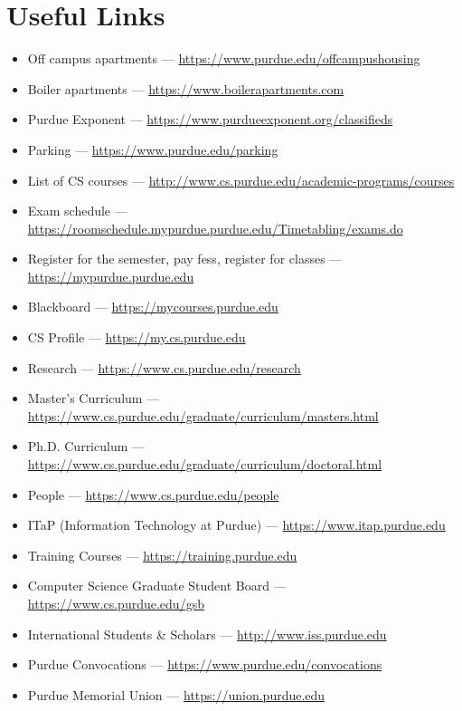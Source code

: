 \section{Useful Links}

\begin{itemize}

	\item Off campus apartments --- \url{https://www.purdue.edu/offcampushousing}

	\item Boiler apartments --- \url{https://www.boilerapartments.com}

	\item Purdue Exponent --- \url{https://www.purdueexponent.org/classifieds}

	\item Parking --- \url{https://www.purdue.edu/parking}

	\item List of CS courses --- \url{http://www.cs.purdue.edu/academic-programs/courses}

	\item Exam schedule --- \url{https://roomschedule.mypurdue.purdue.edu/Timetabling/exams.do}

	\item Register for the semester, pay fess, register for classes --- \url{https://mypurdue.purdue.edu}

	\item Blackboard --- \url{https://mycourses.purdue.edu}

	\item CS Profile --- \url{https://my.cs.purdue.edu}

	\item Research --- \url{https://www.cs.purdue.edu/research}

	\item Master's Curriculum --- \url{https://www.cs.purdue.edu/graduate/curriculum/masters.html}

	\item Ph.D. Curriculum --- \url{https://www.cs.purdue.edu/graduate/curriculum/doctoral.html}

	\item People --- \url{https://www.cs.purdue.edu/people}

	\item ITaP (Information Technology at Purdue) --- \url{https://www.itap.purdue.edu}

	\item Training Courses --- \url{https://training.purdue.edu}

	\item Computer Science Graduate Student Board --- \url{https://www.cs.purdue.edu/gsb}

	\item International Students \& Scholars --- \url{http://www.iss.purdue.edu}

	\item Purdue Convocations --- \url{https://www.purdue.edu/convocations}

	\item Purdue Memorial Union --- \url{https://union.purdue.edu}

\end{itemize}


